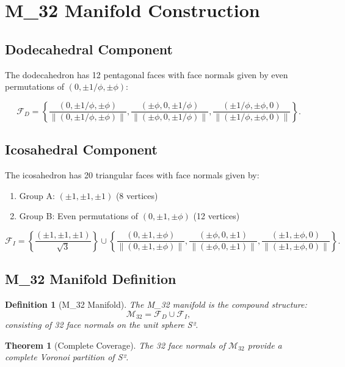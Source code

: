 \documentclass{article}
\newtheorem{theorem}{Theorem}
\newtheorem{definition}{Definition}
\theoremstyle{remark}
\begin{document}
\section{M_32 Manifold Construction}

\subsection{Dodecahedral Component}

The dodecahedron has 12 pentagonal faces with face normals given by even permutations of $(0, \pm 1/\phi, \pm \phi)$:

\[
\mathcal{F}_D = \left\{ \frac{(0, \pm 1/\phi, \pm \phi)}{\|(0, \pm 1/\phi, \pm \phi)\|}, \frac{(\pm \phi, 0, \pm 1/\phi)}{\|(\pm \phi, 0, \pm 1/\phi)\|}, \frac{(\pm 1/\phi, \pm \phi, 0)}{\|(\pm 1/\phi, \pm \phi, 0)\|} \right\}.
\]

\subsection{Icosahedral Component}

The icosahedron has 20 triangular faces with face normals given by:
\begin{enumerate}
\item Group A: $(\pm 1, \pm 1, \pm 1)$ (8 vertices)
\item Group B: Even permutations of $(0, \pm 1, \pm \phi)$ (12 vertices)
\end{enumerate}

\[
\mathcal{F}_I = \left\{ \frac{(\pm 1, \pm 1, \pm 1)}{\sqrt{3}} \right\} \cup \left\{ \frac{(0, \pm 1, \pm \phi)}{\|(0, \pm 1, \pm \phi)\|}, \frac{(\pm \phi, 0, \pm 1)}{\|(\pm \phi, 0, \pm 1)\|}, \frac{(\pm 1, \pm \phi, 0)}{\|(\pm 1, \pm \phi, 0)\|} \right\}.
\]

\subsection{M_32 Manifold Definition}

\begin{definition}[M_32 Manifold]
The M_32 manifold is the compound structure:
\[
\mathcal{M}_{32} = \mathcal{F}_D \cup \mathcal{F}_I,
\]
consisting of 32 face normals on the unit sphere S².
\end{definition}

\begin{theorem}[Complete Coverage]
The 32 face normals of $\mathcal{M}_{32}$ provide a complete Voronoi partition of S².
\end{theorem}
\end{document}
